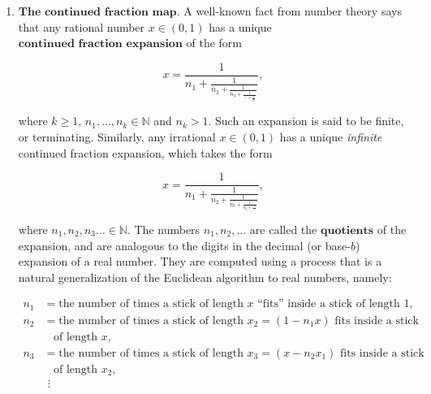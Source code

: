 \documentclass[11pt]{report}
\newcommand{\N}{\mathbb{N}}
\theoremstyle{plain}
\newtheorem{lem}[thm]{Lemma}
\theoremstyle{definition}
\begin{document}
\begin{enumerate}[label=\arabic*.]
\[
D(x) = 2x\textrm{ mod }1 = \begin{cases} 2x&x<\tfrac12, \\ 2x-1&x\ge\tfrac12. \end{cases}
\]

\begin{lem}
$D$ preserves Lebesgue measure.
\end{lem}

\begin{proof}
If $A\subset [0,1]$ is a Borel set, then

\[
\operatorname{Leb}(D^{-1}(A)) =
\operatorname{Leb}\left(\tfrac12 A \sqcup \left(\tfrac12 A+\tfrac12\right) \right)
= \tfrac12 \operatorname{Leb}(A)
+ \tfrac12 \operatorname{Leb}(\tfrac12+A) =
\operatorname{Leb}(A).
\]

\end{proof}

We have seen before that the measure space $[0,1]$ with Lebesgue measure is isomorphic to the product space of an infinite sequence of i.i.d.\ unbiased coin tosses. It is easy to see that under this isomorphism, the doubling map translates to the shift map $S$ of the Bernoulli sequence. So, the doubling map is really a disguised version of the Bernoulli shift associated with i.i.d.\ unbiased coin tosses.
\item $\textbf{The continued fraction map.}$ A well-known fact from number theory says that any rational number $x\in (0,1)$ has a unique $\textbf{continued fraction expansion}$ of the form

\[
x = \frac{1}{n_1+\frac{1}{n_2+\frac{1}{n_3+\frac{1}{\ddots+\frac{1}{n_k}}}}},
\]

where $k\ge 1$, $n_1,\ldots,n_k\in \N$ and $n_k>1$. Such an expansion is said to be finite, or terminating. Similarly, any irrational $x\in(0,1)$ has a unique \emph{infinite} continued fraction expansion, which takes the form

\[
x = \frac{1}{n_1+\frac{1}{n_2+\frac{1}{n_3+\frac{1}{n_4+\frac{1}{\ldots}}}}},
\]

where $n_1,n_2,n_3\ldots \in \N$. The numbers $n_1,n_2,\ldots$ are called the $\textbf{quotients}$ of the expansion, and are analogous to the digits in the decimal (or base-$b$) expansion of a real number. They are computed using a process that is a natural generalization of the Euclidean algorithm to real numbers, namely:

\begin{align*}
n_1 &= \textrm{the number of times a stick of length $x$ ``fits'' inside a stick of length $1$}, \\
n_2 &= \textrm{the number of times a stick of length $x_2=(1-n_1x)$ fits inside a stick}\\ &\ \ \ \ \textrm{of length $x$},
\\
n_3 &= \textrm{the number of times a stick of length $x_3=(x-n_2x_1)$ fits inside a stick} \\
&\ \ \ \ \textrm{of length $x_2$}, \\
& \ \,\vdots
\end{align*}


\end{enumerate}
\end{document}
